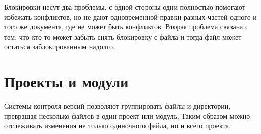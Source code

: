 Блокировки несут два проблемы, с одной стороны одни полностью помогают избежать конфликтов, но не дают одновременной правки разных частей одного и того же документа, где не может быть конфликтов. Вторая проблема связана с тем, что кто-то может забыть снять блокировку с файла и тогда файл может остаться заблокированным надолго.


\section{ Проекты и модули } \label{sect3_10}

Системы контроля версий позволяют группировать файлы и директории, превращая несколько файлов в один проект или модуль. Таким образом можно отслеживать изменения не только одиночного файла, но и всего проекта.






















\clearpage



